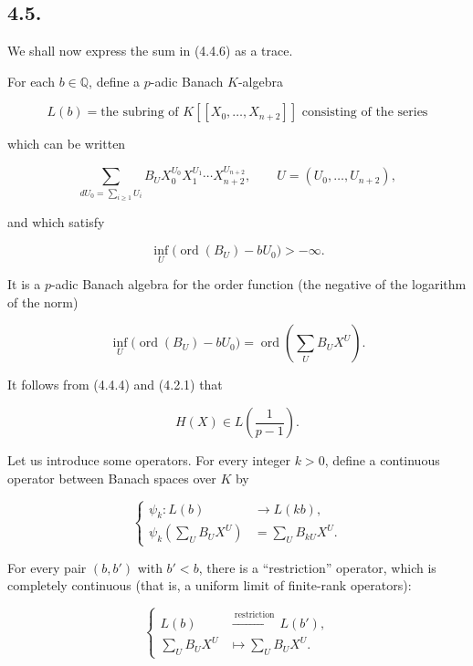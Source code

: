 \subsection*{4.5.}
We shall now express the sum in (4.4.6) as a trace.

For each $b\in\mathbb Q$, define a $p$-adic Banach $K$-algebra

\begin{equation}\tag{4.5.1}
L(b)=\text{the subring of $K[[X_0,\ldots,X_{n+2}]]$ consisting of the
series}
\end{equation}

which can be written

\begin{equation}\tag{4.5.2}
\sum_{dU_0=\sum_{i\geq1}U_i}
B_UX_0^{U_0}X_1^{U_1}\cdots X_{n+2}^{U_{n+2}},
\qquad U=(U_0,\ldots,U_{n+2}),
\end{equation}

and which satisfy

\begin{equation}\tag{4.5.3}
\inf_U\bigl(\operatorname{ord}(B_U)-bU_0\bigr)>-\infty.
\end{equation}

It is a $p$-adic Banach algebra for the order function (the negative of the
logarithm of the norm)

\begin{equation}\tag{4.5.4}
\inf_U\bigl(\operatorname{ord}(B_U)-bU_0\bigr)
=\operatorname{ord}\!\left(\sum_U B_UX^U\right).
\end{equation}

It follows from (4.4.4) and (4.2.1) that

\[
H(X)\in L\!\left(\frac1{p-1}\right).
\]

Let us introduce some operators. For every integer $k>0$, define a
continuous operator between Banach spaces over $K$ by

\begin{equation}\tag{4.5.5}
\left\{
\begin{aligned}
\psi_k:L(b)&\longrightarrow L(kb),\\
\psi_k\!\left(\sum_U B_UX^U\right)&=\sum_U B_{kU}X^U.
\end{aligned}
\right.
\end{equation}

For every pair $(b,b')$ with $b'<b$, there is a ``restriction'' operator,
which is completely continuous (that is, a uniform limit of finite-rank
operators):

\begin{equation}\tag{4.5.6}
\left\{
\begin{aligned}
L(b)&\xrightarrow{\ \text{restriction}\ }L(b'),\\
\sum_U B_UX^U&\longmapsto\sum_U B_UX^U.
\end{aligned}
\right.
\end{equation}

